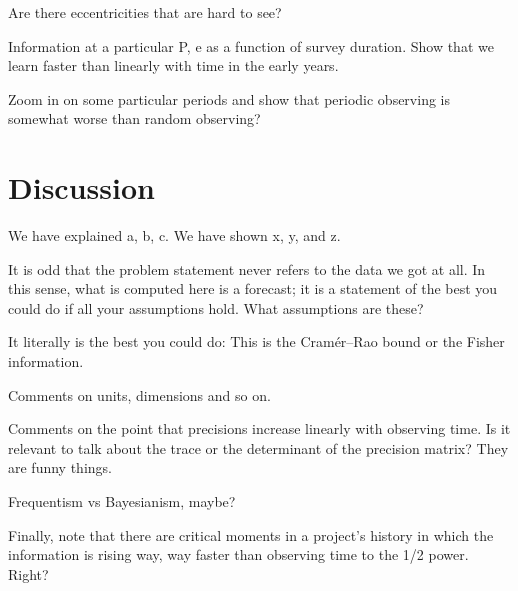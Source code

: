 \documentclass[10pt, letterpaper]{article}
\begin{document}
Are there eccentricities that are hard to see?

Information at a particular P, e as a function of survey duration. Show
that we learn faster than linearly with time in the early years.

Zoom in on some particular periods and show that periodic observing is
somewhat worse than random observing?

\section{Discussion}\label{sec:discussion}

We have explained a, b, c. We have shown x, y, and z.

It is odd that the problem statement never refers to the data we got at all.
In this sense, what is computed here is a forecast; it is a statement of the
best you could do if all your assumptions hold. What assumptions are these?

It literally is the best you could do:
This is the Cram\'er--Rao bound or the Fisher information.

Comments on units, dimensions and so on.

Comments on the point that precisions increase linearly with observing time.
Is it relevant to talk about the trace or the determinant of the precision
matrix? They are funny things.

Frequentism vs Bayesianism, maybe?

Finally, note that there are critical moments in a project's history in which
the information is rising way, way faster than observing time to the 1/2 power.
Right?

\clearmargin\clearpage\raggedright

\end{document}
